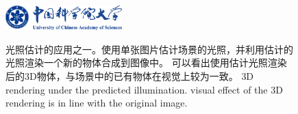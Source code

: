 \begin{figure}[!htbp]
    \centering
    \includegraphics[width=0.40\textwidth]{Img/ucas_logo.pdf}

    \bicaption
    {光照估计的应用之一。使用单张图片估计场景的光照，并利用估计的光照渲染一个新的物体合成到图像中。
    可以看出使用估计光照渲染后的3D物体，与场景中的已有物体在视觉上较为一致。}
    {3D rendering under the predicted illumination.
    visual effect of the 3D rendering is in line with the original image.}
    
    \label{fig:demo-problem-define}
\end{figure}